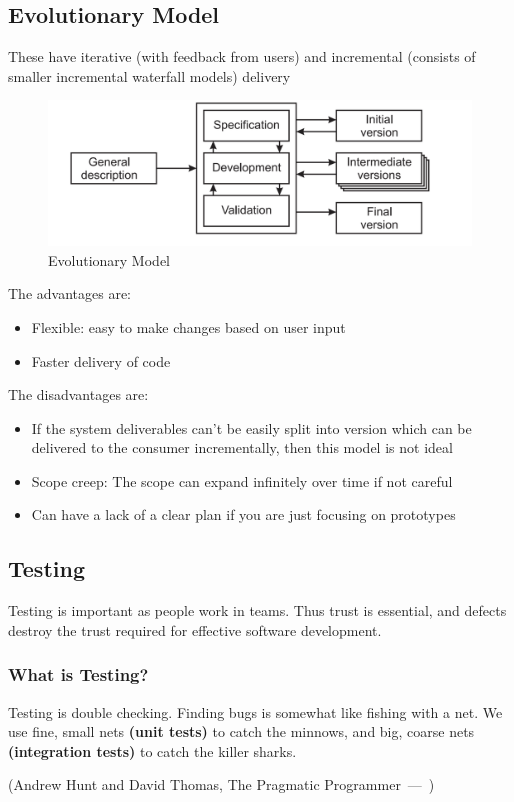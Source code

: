 \documentclass{article}
\let\oldquote\quote
\let\endoldquote\endquote
\renewenvironment{quote}[2][]
  {\if\relax\detokenize{#1}\relax
     \def\quoteauthor{#2}%
   \else
     \def\quoteauthor{#2~---~#1}%
   \fi
   \oldquote}
  {\par\nobreak\smallskip\hfill(\quoteauthor)%
   \endoldquote\addvspace{\bigskipamount}}
\begin{document}
\subsection{Evolutionary Model}
These have iterative (with feedback from users) and incremental (consists of smaller incremental waterfall models) delivery
\begin{figure}[H]
    \centering
\includegraphics[width=0.6\linewidth]{Pictures/Screenshot 2023-02-08 at 12.33.18.png}
\caption{Evolutionary Model}
\end{figure}
The advantages are:
\begin{itemize}
    \item Flexible: easy to make changes based on user input
    \item Faster delivery of code
\end{itemize}
The disadvantages are:
\begin{itemize}
    \item If the system deliverables can't be easily split into version which can be delivered to the consumer incrementally, then this model is not ideal
    \item Scope creep: The scope can expand infinitely over time if not careful
    \item Can have a lack of a clear plan if you are just focusing on prototypes
\end{itemize}
\subsection{Testing}
Testing is important as people work in teams. Thus trust is essential, and defects destroy the trust required for effective software development.
\subsubsection{What is Testing?}
Testing is double checking. 
\begin{quote}{Andrew Hunt and David Thomas, The Pragmatic Programmer}
Finding bugs is somewhat like fishing with a net. We use fine, small nets \textbf{(unit tests)}
 to catch the minnows, and big, coarse nets \textbf{(integration tests)} to catch the killer sharks.
\end{quote}
\end{document}
